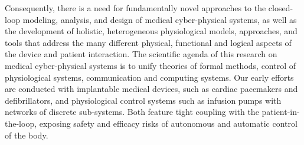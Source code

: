 Consequently, there is a need for fundamentally novel approaches to the closed-loop modeling, analysis, and design of medical cyber-physical systems, as well as the development of holistic, heterogeneous physiological models, approaches, and tools that address the many different physical, functional and logical aspects of the device and patient interaction. The scientific agenda of this research on medical cyber-physical systems is to unify theories of formal methods, control of physiological systems, communication and computing systems. Our early efforts are conducted with implantable medical devices, such as cardiac pacemakers and defibrillators, and physiological control systems such as infusion pumps with networks of discrete sub-systems. Both feature tight coupling with the patient-in-the-loop, exposing safety and efficacy risks of autonomous and automatic control of the body.\vspace{4pt}

